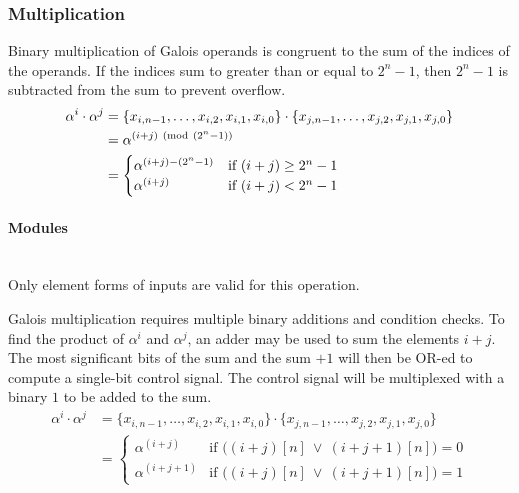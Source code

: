 \subsubsection{Multiplication} Binary multiplication of Galois operands is
congruent to the sum of the indices of the operands. If the indices sum to
greater than or equal to $2^{n}-1$, then $2^{n}-1$ is subtracted from the sum
to prevent overflow.
\begin{align*}
    \alpha^{i} \cdot \alpha^{j} & = \{ x_{i, n-1}, \ldots, x_{i, 2}, x_{i, 1},
    x_{i, 0} \} \cdot \{x_{j, n-1}, \ldots, x_{j, 2}, x_{j, 1}, x_{j, 0}\} \\
    & = \alpha^{(i + j) \ (\mathrm{mod}\ (2^{n}-1))} \\
    & = \begin{cases}
            \alpha^{(i + j) - (2^{n}-1)} & \text{if $(i + j) \geq 2^{n}-1$} \\
            \alpha^{(i + j)} & \text{if $(i + j) < 2^{n}-1$}
        \end{cases}
\end{align*}

    \paragraph{{\small Modules}} \leavevmode \\ Only element forms of
    inputs are valid for this operation.

    Galois multiplication requires multiple binary additions and condition
    checks. To find the product of $\alpha^{i}$ and $\alpha^{j}$, an adder may
    be used to sum the elements $i+j$. The most significant bits of the sum and
    the sum $+1$ will then be OR-ed to compute a single-bit control signal. The
    control signal will be multiplexed with a binary $1$ to be added to the
    sum.
\begin{align*}
    \alpha^{i} \cdot \alpha^{j} & = \{ x_{i, n-1}, \ldots, x_{i, 2}, x_{i, 1},
    x_{i, 0} \} \cdot \{x_{j, n-1}, \ldots, x_{j, 2}, x_{j, 1}, x_{j, 0}\} \\
    & = \begin{cases}
            \alpha^{(i + j)} & \text{if $\Big((i+j)[n] \ \vee \
            (i+j+1)[n]\Big)=0$} \\
            \alpha^{(i + j + 1)} & \text{if $\Big((i+j)[n] \ \vee \
            (i+j+1)[n]\Big)=1$}
        \end{cases}
\end{align*}
